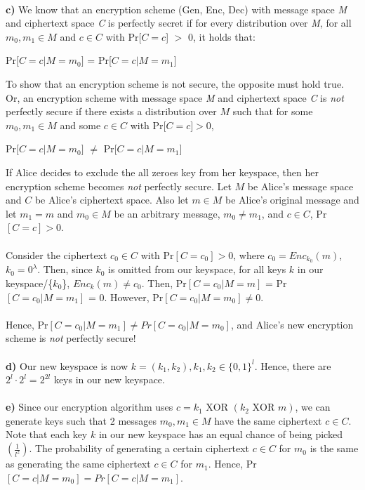 \documentclass[12pt]{article}
\begin{document}
\\
\noindent \textbf{c)} We know that an encryption scheme (Gen, Enc, Dec) with message space \emph{M} and ciphertext space \emph{C} is perfectly secret if for every distribution over \emph{M}, for all $m_0, m_1 \in M$ and $c \in C$ with Pr[$C = c$] $>$ 0, it holds that:
\begin{center}
Pr[$C = c|M=m_0]$ = Pr[$C = c|M=m_1]$
\end{center}
\noindent To show that an encryption scheme is not secure, the opposite must hold true. Or, an encryption scheme  with message space \emph{M} and ciphertext space \emph{C} is \emph{not} perfectly secure  if there exists a distribution over $M$ such that for some $m_0,m_1 \in M$ and some $c \in C$ with Pr[$C = c] > 0$,
\begin{center}
Pr[$C = c|M=m_0]$ $\neq$ Pr[$C = c|M=m_1]$
\end{center}
\noindent If Alice decides to exclude the all zeroes key from her keyspace, then her encryption scheme becomes \emph{not} perfectly secure. Let $M$ be Alice's message space and $C$ be Alice's ciphertext space. Also let $m \in M$ be Alice's original message and let $m_1 = m$ and $m_0 \in M$ be an arbitrary message, $m_0 \neq m_1$, and $c \in C$, Pr$[C=c] > 0$. 
\\
\\
\noindent Consider the ciphertext $c_0 \in C$ with Pr$[C=c_0]>0$, where $c_0 = Enc_{k_0}(m)$, $k_0 = 0^\lambda$. Then, since $k_0$ is omitted from our keyspace, for all keys $k$ in our keyspace/\{$k_0$\}, $Enc_{k}(m) \neq c_0$. Then, Pr$[C=c_0|M=m]$ = Pr$[C=c_0|M=m_1]$ = 0. However, Pr$[C=c_0|M=m_0] \neq 0$. 
\\
\\
\noindent Hence, Pr$[C=c_0|M=m_1] \neq Pr[C=c_0|M=m_0]$, and Alice's new encryption scheme is \emph{not} perfectly secure!
\\
\\
\noindent \textbf{d)} Our new keyspace is now $k = (k_1, k_2), k_1, k_2 \in \{0,1\}^l$. Hence, there are $2^l \cdot 2^l = 2^{2l}$ keys in our new keyspace.
\\
\\
\noindent \textbf{e)} Since our encryption algorithm uses $c = k_1 \text{ XOR }(k_2 \text{ XOR } m)$, we can generate keys such that 2 messages $m_0, m_1 \in M$ have the same ciphertext $c \in C$. Note that each key $k$ in our new keyspace has an equal chance of being picked $(\frac{1}{l^2})$. The probability of generating a certain ciphertext $c \in C$ for $m_0$ is the same as generating the same ciphertext $c \in C$ for $m_1$. Hence, Pr$[C=c|M=m_0] = Pr[C=c|M=m_1]$.
\end{document}
